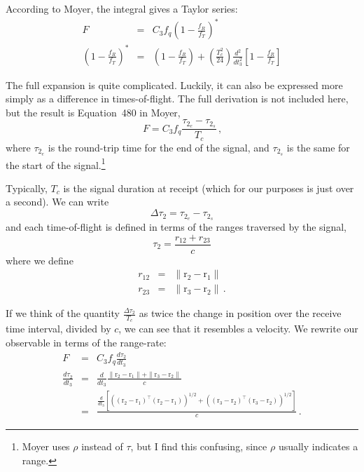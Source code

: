 \documentclass[12pt]{article}
\begin{document}
According to Moyer, the integral gives a Taylor series:
\begin{eqnarray}
F &=& C_3 f_q\left(1 - \frac{f_R}{f_T}\right)^\ast \\
\left(1 - \frac{f_R}{f_T}\right)^\ast &=& \left(1 - \frac{f_R}{f_T}\right) +  \left(\frac{T_c^2}{24}\right)\frac{d^2}{dt_3^2}\!\left[1 - \frac{f_R}{f_T}\right]
\end{eqnarray}

The full expansion is quite complicated. Luckily, it can also be expressed more simply as a difference in times-of-flight. The full derivation is not included here, but the result is Equation~480 in Moyer,
\begin{equation}
F = C_3 f_q \frac{\tau_{2_e} - \tau_{2_s}}{T_c}\,\text{,}
\end{equation}
where $\tau_{2_e}$ is the round-trip time for the end of the signal, and $\tau_{2_s}$ is the same for the start of the signal.\footnote{Moyer uses $\rho$ instead of $\tau$, but I find this confusing, since $\rho$ usually indicates a range.}

\newcommand{\vecr}{\mathrm{r}}
\newcommand{\vecv}{\mathrm{v}}
\newcommand{\veca}{\mathrm{a}}
\newcommand{\vecb}{\mathrm{b}}

Typically, $T_c$ is the signal duration at receipt (which for our purposes is just over a second). We can write
\begin{equation}
\Delta\tau_2 = \tau_{2_e} - \tau_{2_s}
\end{equation}
and each time-of-flight is defined in terms of the ranges traversed by the signal,
\begin{equation}
 \tau_2 = \frac{r_{12} + r_{23}}{c}\label{eq:range_observable}
\end{equation}
where we define
\begin{eqnarray}
r_{12} &=& \| \vecr_2 - \vecr_1 \| \\
r_{23} &=& \| \vecr_3 - \vecr_2 \|\,\text{.}
\end{eqnarray}

If we think of the quantity $\frac{\Delta\tau_2}{T_c}$ as twice the change in position over the receive time interval, divided by $c$, we can see that it resembles a velocity. We rewrite our observable in terms of the range-rate:
\begin{eqnarray}
F &=& C_3 f_q \frac{d\tau_2}{dt_3} \\
\frac{d\tau_2}{dt_3} &=& \frac{d}{dt_3} \frac{ \| \vecr_2 - \vecr_1\| + \| \vecr_3 - \vecr_2 \| }{c} \nonumber\\
&=& \frac{\frac{d}{dt_3}\!\left[ \left(\left(\vecr_2 - \vecr_1\right)^\top\left(\vecr_2 - \vecr_1\right)\right)^{1/2} + \left(\left(\vecr_3 - \vecr_2\right)^\top\left(\vecr_3 - \vecr_2\right)\right)^{1/2} \right]}{c}\,\text{.}
\end{eqnarray}
\end{document}
